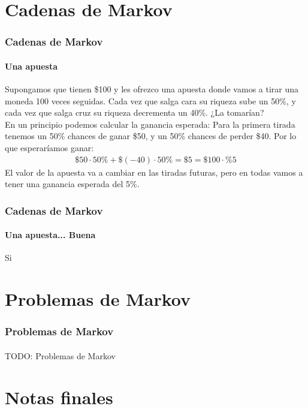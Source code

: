 \documentclass{beamer}
\begin{document}
\newcommand{\SECTIONC}{Cadenas de Markov}
\section{\SECTIONC}

\begin{frame}
  \frametitle{\SECTIONC}
  \framesubtitle{Una apuesta}

  Supongamos que tienen \$100 y les ofrezco una apuesta donde vamos a tirar una moneda 100 veces seguidas. Cada vez que salga cara su riqueza sube un 50\%, y cada vez que salga cruz su riqueza decrementa un 40\%. ¿La tomarían? \pause \\
  En un principio podemos calcular la ganancia esperada: Para la primera tirada tenemos un 50\% chances de ganar \$50, y un 50\% chances de perder \$40. Por lo que esperaríamos ganar:
  \begin{gather*}
    \$50 \cdot 50\% + \$(-40) \cdot 50\% = \$5 = \$100 \cdot \%5
  \end{gather*}
  \pause El valor de la apuesta va a cambiar en las tiradas futuras, pero en todas vamos a tener una ganancia esperada del 5\%.
\end{frame}

\begin{frame}
  \frametitle{\SECTIONC}
  \framesubtitle{Una apuesta... Buena}

   Si
\end{frame}

\newcommand{\SECTIOND}{Problemas de Markov}
\section{\SECTIOND}

\begin{frame}
  \frametitle{\SECTIOND}
  \framesubtitle{}

  TODO: Problemas de Markov
\end{frame}


\section{Notas finales}
\end{document}
